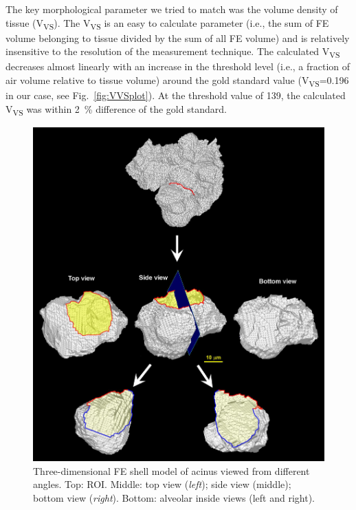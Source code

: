 The key morphological parameter we tried to match was the volume density of tissue (V\textsubscript{VS}). The V\textsubscript{VS} is an easy to calculate parameter (i.e., the sum of FE volume belonging to tissue divided by the sum of all FE volume) and is relatively insensitive to the resolution of the measurement technique. The calculated V\textsubscript{VS} decreases almost linearly with an increase in the threshold level (i.e., a fraction of air volume relative to tissue volume) around the gold standard value (V\textsubscript{VS}=0.196 in our case, see Fig.~\ref{fig:VVSplot}). At the threshold value of 139, the calculated V\textsubscript{VS} was within \SI{2}{\percent} difference of the gold standard.

\begin{figure}[p]
	\centering
	\includegraphics[width=\imsize]{img/Tsuda2008/Tsuda-10}
	\caption[Three-dimensional FE shell model of a partial acinus]{Three-dimensional FE shell model of acinus viewed from different angles. Top: ROI. Middle: top view (\textit{left}); side view (middle); bottom view (\textit{right}). Bottom: alveolar inside views (left and right).}
	\label{fig:alveolus}
\end{figure}

